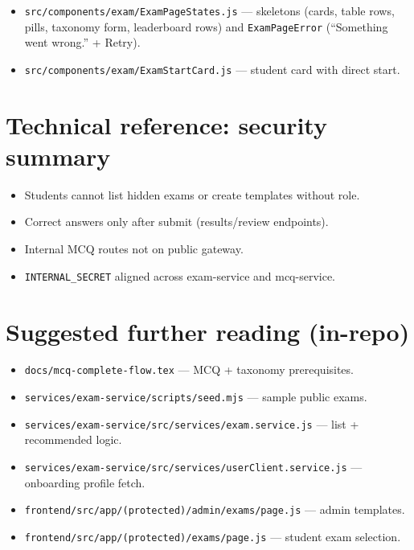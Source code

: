 \documentclass[11pt,a4paper]{article}
\begin{document}
\begin{itemize}[leftmargin=*]
  \item \texttt{src/components/exam/ExamPageStates.js} --- skeletons (cards, table rows, pills, taxonomy form, leaderboard rows) and \texttt{ExamPageError} (``Something went wrong.'' + Retry).
  \item \texttt{src/components/exam/ExamStartCard.js} --- student card with direct start.
\end{itemize}

\section{Technical reference: security summary}

\begin{itemize}[leftmargin=*]
  \item Students cannot list hidden exams or create templates without role.
  \item Correct answers only after submit (results/review endpoints).
  \item Internal MCQ routes not on public gateway.
  \item \texttt{INTERNAL\_SECRET} aligned across exam-service and mcq-service.
\end{itemize}

\section{Suggested further reading (in-repo)}

\begin{itemize}[nosep]
  \item \texttt{docs/mcq-complete-flow.tex} --- MCQ + taxonomy prerequisites.
  \item \texttt{services/exam-service/scripts/seed.mjs} --- sample public exams.
  \item \texttt{services/exam-service/src/services/exam.service.js} --- list + recommended logic.
  \item \texttt{services/exam-service/src/services/userClient.service.js} --- onboarding profile fetch.
  \item \texttt{frontend/src/app/(protected)/admin/exams/page.js} --- admin templates.
  \item \texttt{frontend/src/app/(protected)/exams/page.js} --- student exam selection.
\end{itemize}
\end{document}
